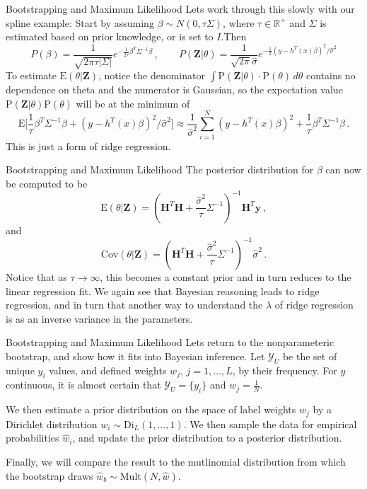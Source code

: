 \documentclass[10pt, table, dvipsnames,xcdraw, handout]{beamer}
\newcommand{\cY}{\ensuremath{\mathcal{Y}}}
\newcommand{\bR}{\ensuremath{\mathbb{R}}}
\newcommand{\bfy}{\ensuremath{\mathbf{y}}}
\begin{document}
\begin{frame}[fragile]{Bootstrapping and Maximum Likelihood}
Lets work through this slowly with our spline example: Start by assuming $\beta \sim N(0,\tau\Sigma)$, where $\tau\in \bR^+$ and $\Sigma$ is estimated based on prior knowledge, or is set to $I$.\pause Then 
$$
P(\beta) = \frac{1}{\sqrt{2\pi\tau|\Sigma|}}e^{-\frac1{2\tau}\beta^T\Sigma^{-1}\beta}\,,\hspace{2em}
P(\mathbf{Z}|\theta) = \frac{1}{\sqrt{2\pi}\hat{\sigma}}e^{-\frac12(y-h^T(x)\beta)^2/\hat{\sigma}^2}
$$\pause 
To estimate $\text{E}(\theta|\mathbf{Z})$, notice the denominator $\int  \text{P}(\mathbf{Z}|\theta)\cdot \text{P}(\theta)\,d\theta$ contains no dependence on theta and the numerator is Gaussian, so the expectation value $\text{P}(\mathbf{Z}|\theta) \text{P}(\theta)$ will be at the minimum of
$$
\text{E}\big[\frac1{\tau}\beta^T\Sigma^{-1}\beta +(y-h^T(x)\beta)^2/\hat{\sigma}^2\big] \approx 
\frac{1}{\hat\sigma^2}\sum_{i=1}^N(y-h^T(x)\beta)^2 + \frac1{\tau}\beta^T\Sigma^{-1}\beta\,.
$$\pause
This is just a form of ridge regression.
\end{frame}



\begin{frame}[fragile]{Bootstrapping and Maximum Likelihood}
The posterior distribution for $\beta$ can now be computed to be
$$
\text{E}(\theta|\mathbf{Z}) = \left( \mathbf{H}^T\mathbf{H} + \frac{\hat\sigma^2}{\tau}\Sigma^{-1} \right)^{-1}\mathbf{H}^T\bfy\,,
$$\pause
and 
$$
\text{Cov}(\theta|\mathbf{Z}) = \left( \mathbf{H}^T\mathbf{H} + \frac{\hat\sigma^2}{\tau}\Sigma^{-1} \right)^{-1}\hat{\sigma}^2\,.
$$\pause
Notice that as $\tau\to \infty$, this becomes a constant prior and in turn reduces to the linear regression fit. \pause We again see that Bayesian reasoning leads to ridge regression, and in turn that another way to understand the $\lambda$ of ridge regression is as an inverse variance in the parameters.
\end{frame}



\begin{frame}[fragile]{Bootstrapping and Maximum Likelihood}
Lets return to the nonparameteric bootstrap, and show how it fits into Bayesian inference. Let $\cY_U$ be the set of unique $y_i$ values, and defined weights $w_j$, $j=1,\ldots, L$, by their frequency. For $y$ continuous, it is almost certain that $\cY_U = \{y_i\}$ and $w_j = \frac{1}{N}$. \pause 

We then estimate a prior distribution on the space of label weights $w_j$ by a  Dirichlet distribution $w_i\sim \text{Di}_L(1,\ldots, 1)$. We then sample the data for empirical probabilities $\hat w_i$, and update the prior distribution to a posterior distribution. \pause

Finally, we will compare the result to the mutlinomial distribution from which the bootstrap draws $\hat{w}_b\sim \text{Mult}(N,\hat{w})$.
\end{frame}
\end{document}
